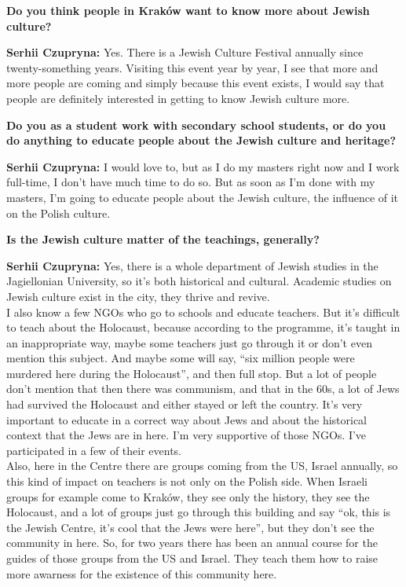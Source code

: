 \textbf{Do you think people in Kraków want to know more about Jewish culture?}\par
\textbf{Serhii Czupryna:} Yes. There is a Jewish Culture Festival annually since twenty-something years. Visiting this event year by year, I see that more and more people are coming and simply because this event exists, I would say that people are definitely interested in getting to know Jewish culture more.\par
\textbf{Do you as a student work with secondary school students, or do you do anything to educate people about the Jewish culture and heritage?} \par
\textbf{Serhii Czupryna:} I would love to, but as I do my masters right now and I work full-time, I don’t have much time to do so. But as soon as I’m done with my masters, I’m going to educate people about the Jewish culture, the influence of it on the Polish culture.\par
\textbf{Is the Jewish culture matter of the teachings, generally?}\par
\textbf{Serhii Czupryna:} Yes, there is a whole department of Jewish studies in the Jagiellonian University, so it’s both historical and cultural. Academic studies on Jewish culture exist in the city, they thrive and revive.\\ 
I also know a few NGOs who go to schools and educate teachers. But it’s difficult to teach about the Holocaust, because according to the programme, it’s taught in an inappropriate way, maybe some teachers just go through it or don’t even mention this subject. And maybe some will say, ``six million people were murdered here during the Holocaust'', and then full stop. But a lot of people don’t mention that then there was communism, and that in the 60s, a lot of Jews had survived the Holocaust and either stayed or left the country. It’s very important to educate in a correct way about Jews and about the historical context that the Jews are in here. I’m very supportive of those NGOs. I’ve participated in a few of their events.\\
Also, here in the Centre there are groups coming from the US, Israel annually, so this kind of impact on teachers is not only on the Polish side. When Israeli groups for example come to Kraków, they see only the history, they see the Holocaust, and a lot of groups just go through this building and say ``ok, this is the Jewish Centre, it’s cool that the Jews were here'', but they don’t see the community in here. So, for two years there has been an annual course for the guides of those groups from the US and Israel. They teach them how to raise more awarness for the existence of this community here.\par  
